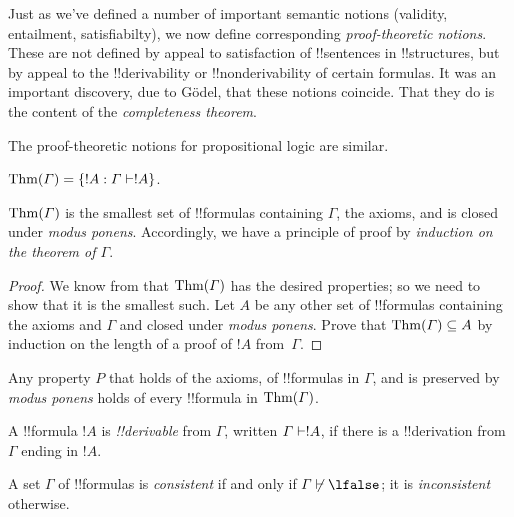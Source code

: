 \documentclass[../../include/open-logic-section]{subfiles}
\begin{document}

\begin{explain}
Just as we've defined a number of important semantic notions
(validity, entailment, satisfiabilty), we now define corresponding
\emph{proof-theoretic notions}.  These are not defined by appeal to
satisfaction of !!{sentence}s in !!{structure}s, but by appeal to the
!!{derivability} or !!{nonderivability} of certain formulas.  It was
an important discovery, due to G\"odel, that these notions coincide.
That they do is the content of the \emph{completeness theorem}.

The proof-theoretic notions for propositional logic are similar.
\end{explain}

\begin{defn}[Theorems]
$\Thms{\Gamma} = \Setabs{!A}{\Gamma \Proves !A}$. 
\end{defn}

\begin{prop}
$\mathrm{Thm}(\Gamma)$ is the smallest set of !!{formula}s containing
$\Gamma$, the axioms, and is closed under \emph{modus
  ponens}. Accordingly, we have a principle of proof by
\emph{induction on the theorem of $\Gamma$}.
\end{prop}

\begin{proof}
We know from  that $\mathrm{Thm}(\Gamma)$ has the
desired properties; so we need to show that it is the smallest
such. Let $A$ be any other set of !!{formula}s containing the axioms
and $\Gamma$ and closed under \emph{modus ponens}. Prove that
$\mathrm{Thm}(\Gamma) \subseteq A$ by induction on the length of a proof of
$!A$ from~$\Gamma$.
\end{proof}

\begin{cor}
Any property $P$ that holds of the axioms, of !!{formula}s in
$\Gamma$, and is preserved by \emph{modus ponens} holds of every
!!{formula} in $\mathrm{Thm}(\Gamma)$.
\end{cor}

\begin{defn}[!!^{derivability}]
A !!{formula} $!A$ is \emph{!!{derivable}} from $\Gamma$, written
$\Gamma \Proves !A$, if there is a !!{derivation} from $\Gamma$ ending
in $!A$.
\end{defn}

\begin{defn}[Consistency]
A set $\Gamma$ of !!{formula}s is \emph{consistent} if and only if
$\Gamma\Proves/ \lfalse$; it is \emph{inconsistent} otherwise.
\end{defn}
\end{document}
